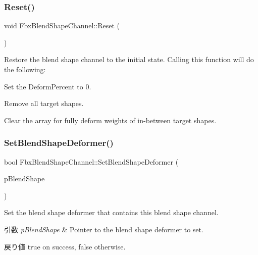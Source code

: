 \subsubsection{\texorpdfstring{Reset()}{Reset()}}
{\footnotesize\ttfamily void Fbx\+Blend\+Shape\+Channel\+::\+Reset (\begin{DoxyParamCaption}{ }\end{DoxyParamCaption})}

Restore the blend shape channel to the initial state. Calling this function will do the following\+: \begin{DoxyItemize}
\item Set the Deform\+Percent to 0. \item Remove all target shapes. \item Clear the array for fully deform weights of in-\/between target shapes. \end{DoxyItemize}
\mbox{\label{class_fbx_blend_shape_channel_afa4cd576c24385c4ee10279a1deabc4d}} 
\subsubsection{\texorpdfstring{Set\+Blend\+Shape\+Deformer()}{SetBlendShapeDeformer()}}
{\footnotesize\ttfamily bool Fbx\+Blend\+Shape\+Channel\+::\+Set\+Blend\+Shape\+Deformer (\begin{DoxyParamCaption}\item[{\hyperlink{class_fbx_blend_shape}{Fbx\+Blend\+Shape} $\ast$}]{p\+Blend\+Shape }\end{DoxyParamCaption})}

Set the blend shape deformer that contains this blend shape channel. 
\begin{DoxyParams}{引数}
{\em p\+Blend\+Shape} & Pointer to the blend shape deformer to set. \\
\hline
\end{DoxyParams}
\begin{DoxyReturn}{戻り値}
{\ttfamily true} on success, {\ttfamily false} otherwise. 
\end{DoxyReturn}
\mbox{\label{class_fbx_blend_shape_channel_a2e06faf81dd8983124645590f673d119}} 
